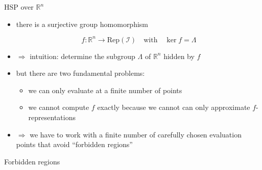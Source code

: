 \documentclass[slideColor]{prosper}
\renewcommand{\R}{\mathbb{R}}
\renewcommand{\>}{\rangle}
\newcommand{\<}{\langle}
\begin{document}

\begin{slide}{HSP over $\R^n$}

\vspace{-0.2cm}
\begin{itemize}
\item there is a surjective group homomorphism

\[
f : \R^n \rightarrow \mathrm{Rep}(\mathcal{I}) \quad \mbox{with}\quad
\ker f = \Lambda
\]

\medskip
\item $\Rightarrow$ intuition: determine the subgroup $\Lambda$ of $\R^n$ 
hidden by $f$

\medskip
\item but there are two fundamental problems:

\medskip
\begin{itemize}
\item we can only evaluate at a finite number of points

\medskip
\item we cannot compute $f$ exactly because we cannot can only approximate $f$-representations 
\end{itemize}

\item $\Rightarrow$ we have to work with a finite number of carefully chosen evaluation points that avoid ``forbidden regions''
\end{itemize}

\end{slide}


\begin{slide}{Forbidden regions}

\end{slide}

\end{document}
